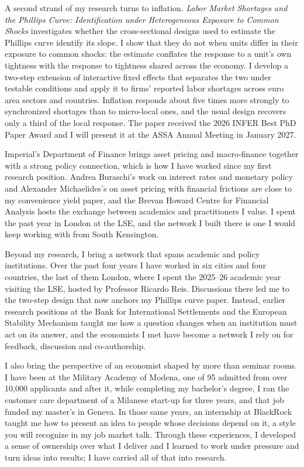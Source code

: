 \documentclass[11pt]{article}
\begin{document}
A second strand of my research turns to inflation. \textit{Labor Market Shortages and the Phillips Curve: Identification under Heterogeneous Exposure to Common Shocks} investigates whether the cross-sectional designs used to estimate the Phillips curve identify its slope. I show that they do not when units differ in their exposure to common shocks: the estimate conflates the response to a unit's own tightness with the response to tightness shared across the economy. I develop a two-step extension of interactive fixed effects that separates the two under testable conditions and apply it to firms' reported labor shortages across euro area sectors and countries. Inflation responds about five times more strongly to synchronized shortages than to micro-local ones, and the usual design recovers only a third of the local response. The paper received the 2026 INFER Best PhD Paper Award and I will present it at the ASSA Annual Meeting in January 2027.

Imperial's Department of Finance brings asset pricing and macro-finance together with a strong policy connection, which is how I have worked since my first research position. Andrea Buraschi's work on interest rates and monetary policy and Alexander Michaelides's on asset pricing with financial frictions are close to my convenience yield paper, and the Brevan Howard Centre for Financial Analysis hosts the exchange between academics and practitioners I value. I spent the past year in London at the LSE, and the network I built there is one I would keep working with from South Kensington.

Beyond my research, I bring a network that spans academic and policy institutions. Over the past four years I have worked in six cities and four countries, the last of them London, where I spent the 2025--26 academic year visiting the LSE, hosted by Professor Ricardo Reis. Discussions there led me to the two-step design that now anchors my Phillips curve paper. Instead, earlier research positions at the Bank for International Settlements and the European Stability Mechanism taught me how a question changes when an institution must act on its answer, and the economists I met have become a network I rely on for feedback, discussion and co-authorship.

I also bring the perspective of an economist shaped by more than seminar rooms. I have been at the Military Academy of Modena, one of 95 admitted from over 10,000 applicants and after it, while completing my bachelor's degree, I ran the customer care department of a Milanese start-up for three years, and that job funded my master's in Geneva. In those same years, an internship at BlackRock taught me how to present an idea to people whose decisions depend on it, a style you will recognize in my job market talk. Through these experiences, I developed a sense of ownership over what I deliver and I learned to work under pressure and turn ideas into results; I have carried all of that into research. %
\end{document}
